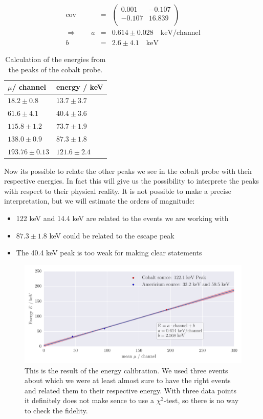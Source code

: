 \begin{eqnarray}
    \mathrm{cov} &=& 
    \begin{pmatrix}
        0.001 &-0.107 \\
        -0.107 &16.839 \\
    \end{pmatrix}
\\ \Rightarrow \qquad
    a &=& 0.614 \pm 0.028 \quad \mathrm{keV/channel}\\
    b &=& 2.6 \pm 4.1 \quad \mathrm{keV}
\end{eqnarray}
\begin{table}
\begin{tabular}{l|l}
$\mu$/ channel & energy / keV  \\ 
\hline
$18.2 \pm 0.8 $ &$ 13.7 \pm 3.7 $ \\ 
$61.6 \pm 4.1 $ &$ 40.4 \pm 3.6 $\\
$115.8 \pm 1.2 $  &$ 73.7 \pm 1.9 $\\
$138.0 \pm 0.9 $  & $87.3 \pm 1.8 $\\
$193.76 \pm 0.13 $ & $ 121.6 \pm 2.4 $
\end{tabular}
\caption{Calculation of the energies from the peaks of the cobalt probe.}
\end{table}
 Now its possible to relate the other peaks we see in the cobalt probe with their respective energies.
In fact this will give us the possibility to interprete the peaks with respect to their physical reality.
It is not possible to make a precise interpretation, but we will estimate the orders of magnitude:
\begin{itemize}
\item 122 keV and 14.4 keV are related to the events we are working with
\item $87.3 \pm 1.8$ keV could be related to the escape peak 
\item The 40.4 keV peak is too weak for making clear statements
\end{itemize}
\begin{figure}[htpb]
    \centering
    \includegraphics[width=1.0\linewidth]{analysis/figures/plot_E}
    \caption{This is the result of the energy calibration. We used three events about which we were at least
almost sure to have the right events and related them to their respective energy. With three data points  
it definitely does not make sence to use a $\chi^2$-test, so there is no way to check the fidelity.}
    \label{fig:fit_peaks}
\end{figure}

